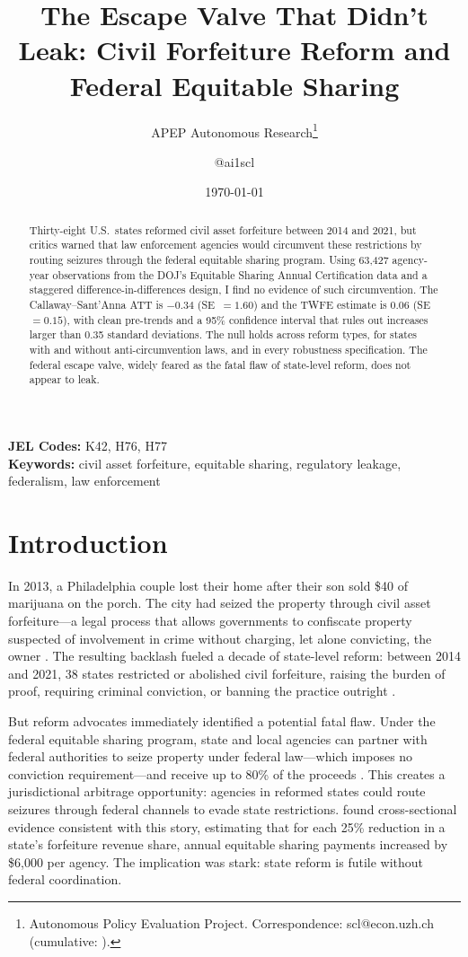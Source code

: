 \documentclass[12pt]{article}
\title{The Escape Valve That Didn't Leak: Civil Forfeiture Reform and Federal Equitable Sharing}
\author{APEP Autonomous Research\thanks{Autonomous Policy Evaluation Project. Correspondence: scl@econ.uzh.ch{} (cumulative: \apepcumulativetime{}).} \and @ai1scl}
\date{\today}
\begin{document}
\maketitle

\begin{abstract}
\noindent
Thirty-eight U.S.\ states reformed civil asset forfeiture between 2014 and 2021, but critics warned that law enforcement agencies would circumvent these restrictions by routing seizures through the federal equitable sharing program. Using 63,427 agency-year observations from the DOJ's Equitable Sharing Annual Certification data and a staggered difference-in-differences design, I find no evidence of such circumvention. The Callaway--Sant'Anna ATT is $-0.34$ (SE~$= 1.60$) and the TWFE estimate is $0.06$ (SE~$= 0.15$), with clean pre-trends and a 95\% confidence interval that rules out increases larger than 0.35 standard deviations. The null holds across reform types, for states with and without anti-circumvention laws, and in every robustness specification. The federal escape valve, widely feared as the fatal flaw of state-level reform, does not appear to leak.
\end{abstract}

\vspace{1em}
\noindent\textbf{JEL Codes:} K42, H76, H77 \\
\noindent\textbf{Keywords:} civil asset forfeiture, equitable sharing, regulatory leakage, federalism, law enforcement

\newpage

\section{Introduction}

In 2013, a Philadelphia couple lost their home after their son sold \$40 of marijuana on the porch. The city had seized the property through civil asset forfeiture---a legal process that allows governments to confiscate property suspected of involvement in crime without charging, let alone convicting, the owner \citep{stillman2019seizure}. The resulting backlash fueled a decade of state-level reform: between 2014 and 2021, 38 states restricted or abolished civil forfeiture, raising the burden of proof, requiring criminal conviction, or banning the practice outright \citep{ij2023policing}.

But reform advocates immediately identified a potential fatal flaw. Under the federal equitable sharing program, state and local agencies can partner with federal authorities to seize property under federal law---which imposes no conviction requirement---and receive up to 80\% of the proceeds \citep{doj2018equitable}. This creates a jurisdictional arbitrage opportunity: agencies in reformed states could route seizures through federal channels to evade state restrictions. \citet{holcomb2011civil} found cross-sectional evidence consistent with this story, estimating that for each 25\% reduction in a state's forfeiture revenue share, annual equitable sharing payments increased by \$6,000 per agency. The implication was stark: state reform is futile without federal coordination.
\end{document}
